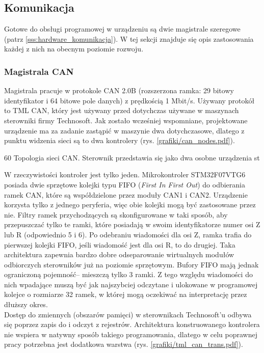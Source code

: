 \subsection{Komunikacja}

Gotowe do obsługi programowej w urządzeniu są dwie magistrale szeregowe (patrz \ref{sss:hardware_komunikacja}). W tej sekcji znajduje się opis zastosowania każdej z nich na obecnym poziomie rozwoju.

\subsubsection{Magistrala CAN}

Magistrala pracuje w protokole CAN 2.0B (rozszerzona ramka: 29 bitowy identyfikator i 64 bitowe pole danych) z prędkością 1 Mbit/s. Używany protokół to TML CAN, który jest używany przed dotychczas używane w maszynach sterowniki firmy Technosoft. Jak zostało wcześniej wspomniane, projektowane urządzenie ma za zadanie zastąpić w maszynie dwa dotychczasowe, dlatego z punktu widzenia sieci są to dwa kontrolery (rys. \ref{grafiki/can_nodes.pdf}).

	{60}
	{Topologia sieci CAN. Sterownik przedstawia się jako dwa osobne urządzenia}
	{st}
	
W rzeczywistości kontroler jest tylko jeden. Mikrokontroler STM32F07VTG6 posiada dwie sprzętowe kolejki typu FIFO ({\it First In First Out}) do odbierania ramek CAN, które są współdzielone przez moduły CAN1 i CAN2. Urządzenie korzysta tylko z jednego peryferia, więc obie kolejki mogą być zastosowane przez nie. Filtry ramek przychodzących są skonfigurowane w taki sposób, aby przepuszczać tylko te ramki, które posiadają w swoim identyfikatorze numer osi Z lub R (odpowiednio 5 i 6). Po odebraniu wiadomości dla osi Z, ramka trafia do pierwszej kolejki FIFO, jeśli wiadomość jest dla osi R, to do drugiej. Taka architektura zapewnia bardzo dobre odseparowanie wirtualnych modułów odbiorczych sterowników już na poziomie sprzętowym. Bufory FIFO mają jednak ograniczoną pojemność-- mieszczą tylko 3 ramki. Z tego względu wiadomości do nich wpadające muszą być jak najszybciej odczytane i ulokowane w programowej kolejce o rozmiarze 32 ramek, w której mogą oczekiwać na interpretację przez dłuższy okres. \\

Dostęp do zmiennych (obszarów pamięci) w sterownikach Technosoft'u odbywa się poprzez zapis do i odczyt z rejestrów. Architektura konstruowanego kontrolera nie wspiera w natywny sposób takiego programowania, dlatego w celu poprawnej pracy potrzebna jest dodatkowa warstwa (rys. \ref{grafiki/tml_can_trans.pdf}).

